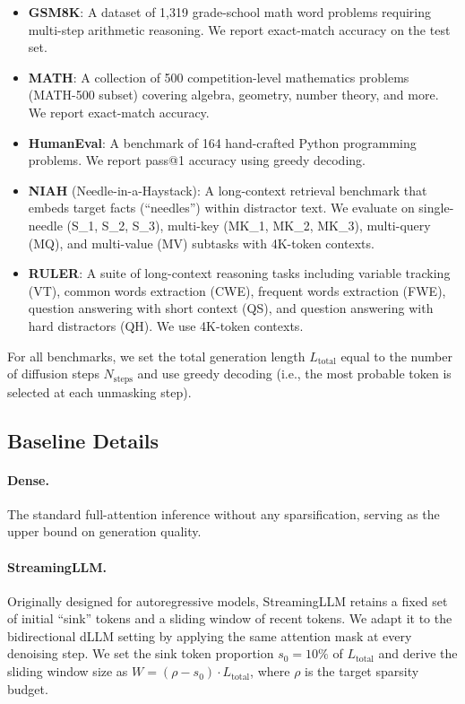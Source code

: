 \documentclass{article}
\theoremstyle{plain}
\theoremstyle{definition}
\theoremstyle{remark}
\begin{document}
\begin{itemize}
    \item \textbf{GSM8K}: A dataset of 1,319 grade-school math word problems requiring multi-step arithmetic reasoning. We report exact-match accuracy on the test set.
    \item \textbf{MATH}: A collection of 500 competition-level mathematics problems (MATH-500 subset) covering algebra, geometry, number theory, and more. We report exact-match accuracy.
    \item \textbf{HumanEval}: A benchmark of 164 hand-crafted Python programming problems. We report pass@1 accuracy using greedy decoding.
    \item \textbf{NIAH} (Needle-in-a-Haystack): A long-context retrieval benchmark that embeds target facts (``needles'') within distractor text. We evaluate on single-needle (S\_1, S\_2, S\_3), multi-key (MK\_1, MK\_2, MK\_3), multi-query (MQ), and multi-value (MV) subtasks with 4K-token contexts.
    \item \textbf{RULER}: A suite of long-context reasoning tasks including variable tracking (VT), common words extraction (CWE), frequent words extraction (FWE), question answering with short context (QS), and question answering with hard distractors (QH). We use 4K-token contexts.
\end{itemize}

For all benchmarks, we set the total generation length $L_{\text{total}}$ equal to the number of diffusion steps $N_{\text{steps}}$ and use greedy decoding (i.e., the most probable token is selected at each unmasking step).

\subsection{Baseline Details}
\label{app:baselines}

\paragraph{Dense.}
The standard full-attention inference without any sparsification, serving as the upper bound on generation quality.

\paragraph{StreamingLLM.}
Originally designed for autoregressive models, StreamingLLM retains a fixed set of initial ``sink'' tokens and a sliding window of recent tokens. We adapt it to the bidirectional dLLM setting by applying the same attention mask at every denoising step. We set the sink token proportion $s_0 = 10\%$ of $L_{\text{total}}$ and derive the sliding window size as $W = (\rho - s_0) \cdot L_{\text{total}}$, where $\rho$ is the target sparsity budget.
\end{document}
